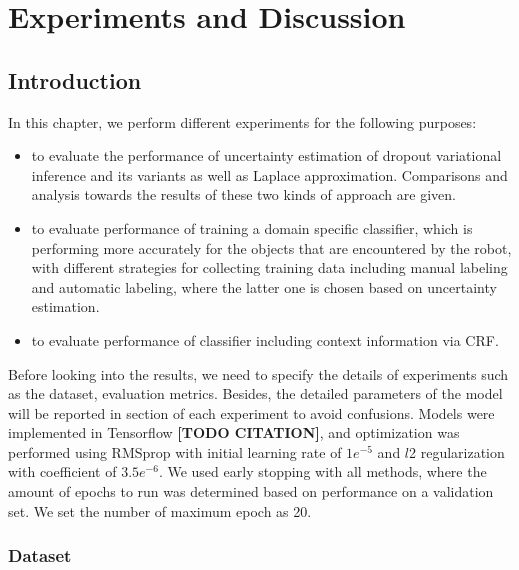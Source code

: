 
\chapter{Experiments and Discussion}

\section{Introduction}
In this chapter, we perform different experiments for the following purposes:
\begin{itemize}
	\item to evaluate the performance of uncertainty estimation of dropout variational inference and its variants as well as Laplace approximation. Comparisons and analysis towards the results of these two kinds of approach are given.
	
	\item to evaluate performance of training a domain specific classifier, which is performing more accurately for the objects that are encountered by the robot, with different strategies for collecting training data including manual labeling and automatic labeling, where the latter one is chosen based on uncertainty estimation.
	
	\item to evaluate performance of classifier including context information via CRF.
\end{itemize}

Before looking into the results, we need to specify the details of experiments such as the dataset, evaluation metrics. Besides, the detailed parameters of the model will be reported in section of each experiment to avoid confusions. Models were implemented in Tensorflow \textbf{[TODO CITATION]}, and optimization was performed using RMSprop with initial learning rate of $1e^{-5}$ and $l$2 regularization with coefficient of $3.5e^{-6}$. We used early stopping with all methods, where the amount of epochs to run was determined based on performance on a validation set. We set the number of maximum epoch as 20.

\subsection{Dataset}
